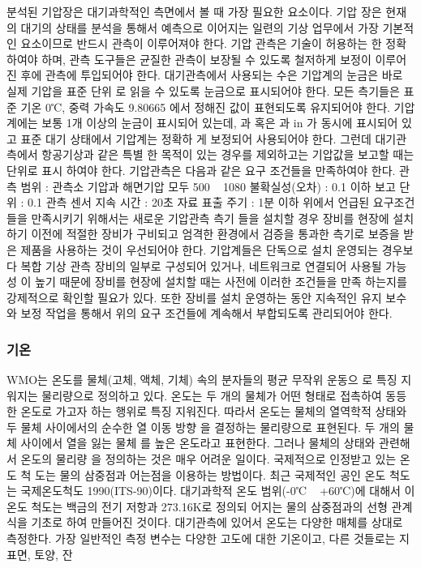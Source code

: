 분석된 기압장은 대기과학적인 측면에서 볼 때 가장 필요한 요소이다. 기압
장은 현재의 대기의 상태를 분석을 통해서 예측으로 이어지는 일련의 기상
업무에서 가장 기본적인 요소이므로 반드시 관측이 이루어져야 한다. 기압
관측은 기술이 허용하는 한 정확하여야 하며, 관측 도구들은 균질한 관측이
보장될 수 있도록 철저하게 보정이 이루어진 후에 관측에 투입되어야 한다.
대기관측에서 사용되는 수은 기압계의 눈금은 바로 실제 기압을 표준 단위
로 읽을 수 있도록 눈금으로 표시되어야 한다. 모든 측기들은 표준 기온
0℃, 중력 가속도 9.80665 에서 정해진 값이 표현되도록 유지되어야
한다.
기압계에는 보통 1개 이상의 눈금이 표시되어 있는데, 과 혹은
과 in 가 동시에 표시되어 있고 표준 대기 상태에서 기압계는 정확하
게 보정되어 사용되어야 한다. 그런데 대기관측에서 항공기상과 같은 특별
한 목적이 있는 경우를 제외하고는 기압값을 보고할 때는 단위로 표시
하여야 한다.
기압관측은 다음과 같은 요구 조건들을 만족하여야 한다.
관측 범위 : 관측소 기압과 해면기압 모두 500 ~ 1080
불확실성(오차) : 0.1 이하
보고 단위 : 0.1
관측 센서 지속 시간 : 20초
자료 표출 주기 : 1분 이하
위에서 언급된 요구조건들을 만족시키기 위해서는 새로운 기압관측 측기
들을 설치할 경우 장비를 현장에 설치하기 이전에 적절한 장비가 구비되고
엄격한 환경에서 검증을 통과한 측기로 보증을 받은 제품을 사용하는 것이
우선되어야 한다. 기압계들은 단독으로 설치 운영되는 경우보다 복합 기상
관측 장비의 일부로 구성되어 있거나, 네트워크로 연결되어 사용될 가능성
이 높기 때문에 장비를 현장에 설치할 때는 사전에 이러한 조건들을 만족
하는지를 강제적으로 확인할 필요가 있다. 또한 장비를 설치 운영하는 동안
지속적인 유지 보수와 보정 작업을 통해서 위의 요구 조건들에 계속해서
부합되도록 관리되어야 한다.

\subsubsection{기온}
WMO는 온도를 물체(고체, 액체, 기체) 속의 분자들의 평균 무작위 운동으
로 특징 지워지는 물리량으로 정의하고 있다. 온도는 두 개의 물체가 어떤
형태로 접촉하여 동등한 온도로 가고자 하는 행위로 특징 지워진다. 따라서
온도는 물체의 열역학적 상태와 두 물체 사이에서의 순수한 열 이동 방향
을 결정하는 물리량으로 표현된다. 두 개의 물체 사이에서 열을 잃는 물체
를 높은 온도라고 표현한다. 그러나 물체의 상태와 관련해서 온도의 물리량
을 정의하는 것은 매우 어려운 일이다. 국제적으로 인정받고 있는 온도 척
도는 물의 삼중점과 어는점을 이용하는 방법이다. 최근 국제적인 공인 온도
척도는 국제온도척도 1990(ITS-90)이다. 대기과학적 온도 범위(-0℃ ~
+60℃)에 대해서 이 온도 척도는 백금의 전기 저항과 273.16K로 정의되
어지는 물의 삼중점과의 선형 관계식을 기초로 하여 만들어진 것이다.
대기관측에 있어서 온도는 다양한 매체를 상대로 측정한다. 가장 일반적인
측정 변수는 다양한 고도에 대한 기온이고, 다른 것들로는 지표면, 토양, 잔

